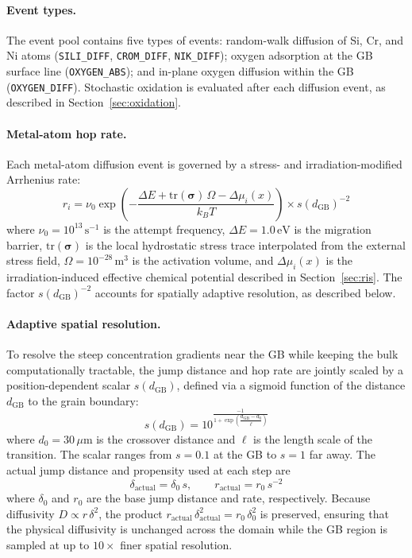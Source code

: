 \documentclass[12pt]{article}
\begin{document}
\paragraph{Event types.}
The event pool contains five types of events: random-walk diffusion of Si, Cr, and Ni atoms (\texttt{SILI\_DIFF}, \texttt{CROM\_DIFF}, \texttt{NIK\_DIFF}); oxygen adsorption at the GB surface line (\texttt{OXYGEN\_ABS}); and in-plane oxygen diffusion within the GB (\texttt{OXYGEN\_DIFF}). Stochastic oxidation is evaluated after each diffusion event, as described in Section~\ref{sec:oxidation}.  %

\paragraph{Metal-atom hop rate.}
Each metal-atom diffusion event is governed by a stress- and irradiation-modified Arrhenius rate:
\begin{equation}\label{equ:hoprate}
r_i = \nu_0 \exp\!\left(-\frac{\Delta E + \mathrm{tr}(\boldsymbol{\sigma})\,\Omega - \Delta\mu_i(x)}{k_B T}\right) \times s(d_\mathrm{GB})^{-2}
\end{equation}
where $\nu_0 = 10^{13}\,\mathrm{s}^{-1}$ is the attempt frequency, $\Delta E = 1.0\,\mathrm{eV}$ is the migration barrier, $\mathrm{tr}(\boldsymbol{\sigma})$ is the local hydrostatic stress trace interpolated from the external stress field, $\Omega = 10^{-28}\,\mathrm{m}^3$ is the activation volume, and $\Delta\mu_i(x)$ is the irradiation-induced effective chemical potential described in Section~\ref{sec:ris}. The factor $s(d_\mathrm{GB})^{-2}$ accounts for spatially adaptive resolution, as described below.

\paragraph{Adaptive spatial resolution.}
To resolve the steep concentration gradients near the GB while keeping the bulk computationally tractable, the jump distance and hop rate are jointly scaled by a position-dependent scalar $s(d_\mathrm{GB})$, defined via a sigmoid function of the distance $d_\mathrm{GB}$ to the grain boundary:
\begin{equation}\label{equ:scalar}
s(d_\mathrm{GB}) = 10^{\displaystyle\frac{-1}{1+\exp\!\left(\dfrac{d_\mathrm{GB} - d_0}{\ell}\right)}}
\end{equation}
where $d_0 = 30\,\mu\mathrm{m}$ is the crossover distance and $\ell$ is the length scale of the transition. The scalar ranges from $s = 0.1$ at the GB to $s = 1$ far away. The actual jump distance and propensity used at each step are
\begin{equation}\label{equ:adaptivejump}
\delta_\mathrm{actual} = \delta_0\, s, \qquad r_\mathrm{actual} = r_0\, s^{-2}
\end{equation}
where $\delta_0$ and $r_0$ are the base jump distance and rate, respectively. Because diffusivity $D \propto r\,\delta^2$, the product $r_\mathrm{actual}\,\delta_\mathrm{actual}^2 = r_0\,\delta_0^2$ is preserved, ensuring that the physical diffusivity is unchanged across the domain while the GB region is sampled at up to $10\times$ finer spatial resolution.
\end{document}
